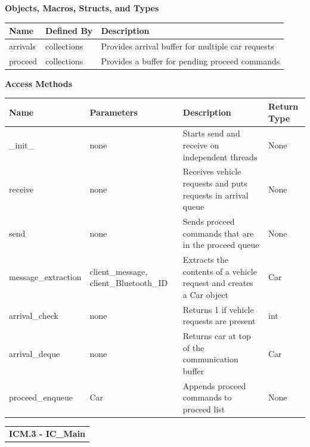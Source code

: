 \documentclass [10pt]{article}
\begin{document}
\textbf{Objects, Macros, Structs, and Types}\\ 
\begin{longtable}{| p{ }  p{ } p{}|} \hline

 \textbf{Name} & \textbf{Defined By} & \textbf{Description} \\\hline
\rowcolor{tableCell} arrivals & collections & Provides arrival buffer for  multiple car requests\\ \hline
proceed & collections & Provides a buffer for  pending proceed commands\\ \hline


\end{longtable}



\textbf{Access Methods}\\ 



\begin{longtable}{| p{ }  p{ } p{} p{} |} \hline
\textbf{Name} & \textbf{Parameters} & \textbf{Description} &\textbf{Return Type} \\\hline
\rowcolor{tableCell} \_init\_ & none & Starts send and receive on independent threads  &  None\\\hline
 receive & none & Receives vehicle requests and puts requests in arrival queue & None\\\hline
\rowcolor{tableCell} send& none & Sends proceed commands that are in the proceed queue  &  None\\\hline 
 message\_extraction& client\_message, client\_Bluetooth\_ID & Extracts the contents of a vehicle request and creates a Car object  & Car \\\hline
 \rowcolor{tableCell} arrival\_check & none & Returns 1 if vehicle requests are present & int\\ \hline
arrival\_deque & none & Returns car at top of the communication buffer & Car\\ \hline
\rowcolor{tableCell} proceed\_enqueue & Car & Appends proceed commands to proceed list & None\\ \hline




\end{longtable}

\begin{longtable}{p{}}
\rowcolor{subsectionC}\textbf{ICM.3 - IC\_Main} \\ 
\end{longtable}
  
\end{document}
